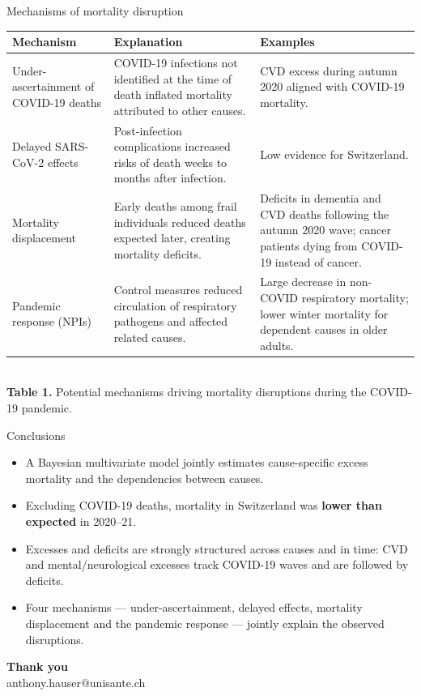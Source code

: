 \documentclass[aspectratio=169,10pt]{beamer}
\newcommand{\compresslist}{%
  \setlength{\itemsep}{2pt}%
  \setlength{\parskip}{0pt}%
  \setlength{\parsep}{0pt}%
}
\newcommand{\figcaption}[1]{{\tiny #1}}
\begin{document}
\begin{frame}{Mechanisms of mortality disruption}
  \centering
  {\scriptsize
  \begin{tabular}{p{2.4cm} p{4.2cm} p{5.2cm}}
    \toprule
    \textbf{Mechanism} & \textbf{Explanation} & \textbf{Examples} \\
    \midrule
    \raggedright Under-ascertainment of COVID-19 deaths &
      COVID-19 infections not identified at the time of death inflated mortality
      attributed to other causes. &
      CVD excess during autumn 2020 aligned with COVID-19 mortality. \\
    \midrule
    \raggedright Delayed SARS-CoV-2 effects &
      Post-infection complications increased risks of death weeks to months after
      infection. &
      Low evidence for Switzerland. \\
    \midrule
    \raggedright Mortality displacement &
      Early deaths among frail individuals reduced deaths expected later, creating
      mortality deficits. &
      Deficits in dementia and CVD deaths following the autumn 2020 wave;
      cancer patients dying from COVID-19 instead of cancer. \\
    \midrule
    \raggedright Pandemic response (NPIs) &
      Control measures reduced circulation of respiratory pathogens and affected
      related causes. &
      Large decrease in non-COVID respiratory mortality; lower winter mortality
      for dependent causes in older adults. \\
    \bottomrule
  \end{tabular}}\\[0.4em]
  \figcaption{\textbf{Table 1.} Potential mechanisms driving mortality disruptions
    during the COVID-19 pandemic.}
\end{frame}

\begin{frame}{Conclusions}
  \begin{itemize}\compresslist
    \item A Bayesian multivariate model jointly estimates cause-specific excess
          mortality and the dependencies between causes.
    \item Excluding COVID-19 deaths, mortality in Switzerland was
          \textbf{lower than expected} in 2020--21.
    \item Excesses and deficits are strongly structured across causes and in time:
          CVD and mental/neurological excesses track COVID-19 waves and are
          followed by deficits.
    \item Four mechanisms --- under-ascertainment, delayed effects, mortality
          displacement and the pandemic response --- jointly explain the observed
          disruptions.
  \end{itemize}
\end{frame}

\begin{frame}[plain]
  \centering
  \vfill
  {\Large\bfseries\color{headerfontcol} Thank you}\\[1em]
  {\small anthony.hauser@unisante.ch}
  \vfill
\end{frame}
\end{document}
